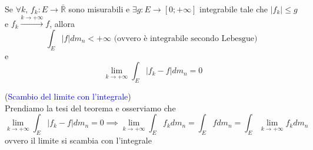 \vspace{0.5cm}
\begin{theorem}[\textcolor{blue}{della convergenza dominata di Lebesgue}] 
	
	Se $\forall k, \, f_k: E \to \bar{\mathbb{R}}$ sono misurabili e $\exists g: E \to [0; +\infty]$ integrabile tale che $|f_k| \leq g$ e $f_k \stackrel{k \to +\infty}{\to} f$, allora
	$$
	\int_E |f|dm_n < +\infty \text{ (ovvero è integrabile secondo Lebesgue) }
	$$
	e
	\begin{equation}
		\lim_{k \to +\infty} \int_E |f_k - f| dm_n = 0
	\end{equation}
\end{theorem}
%
\begin{remark}(\textcolor{blue}{Scambio del limite con l'integrale}) \\
	Prendiamo la tesi del teorema e osserviamo che
	$$
	\lim_{k \to +\infty} \int_E |f_k - f| dm_n = 0 \implies \lim_{k \to +\infty} \int_E f_k dm_n = \int_E f dm_n = \int_E \lim_{k \to +\infty} f_k dm_n
	$$
	ovvero il limite si scambia con l'integrale
\end{remark}
%
\vspace{0.5cm}
